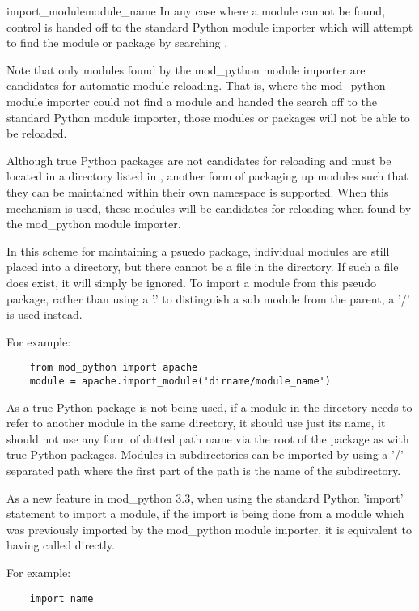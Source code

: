\begin{funcdesc}{import_module}{module_name}
  In any case where a module cannot be found, control is handed off to the
  standard Python module importer which will attempt to find the module or
  package by searching .

  Note that only modules found by the mod_python module importer are
  candidates for automatic module reloading. That is, where the mod_python
  module importer could not find a module and handed the search off to the
  standard Python module importer, those modules or packages will not be
  able to be reloaded.

  Although true Python packages are not candidates for reloading and must
  be located in a directory listed in , another form of
  packaging up modules such that they can be maintained within their own
  namespace is supported. When this mechanism is used, these modules will
  be candidates for reloading when found by the mod_python module importer.

  In this scheme for maintaining a psuedo package, individual modules are
  still placed into a directory, but there cannot be a 
  file in the directory. If such a file does exist, it will simply be
  ignored. To import a module from this pseudo package, rather than using
  a '.' to distinguish a sub module from the parent, a '/' is used instead.

  For example:

  \begin{verbatim}
    from mod_python import apache
    module = apache.import_module('dirname/module_name')
  \end{verbatim}

  As a true Python package is not being used, if a module in the directory
  needs to refer to another module in the same directory, it should use
  just its name, it should not use any form of dotted path name via the
  root of the package as with true Python packages. Modules in
  subdirectories can be imported by using a '/' separated path where the
  first part of the path is the name of the subdirectory.

  As a new feature in mod_python 3.3, when using the standard Python
  'import' statement to import a module, if the import is being done from a
  module which was previously imported by the mod_python module importer,
  it is equivalent to having called  directly.

  For example:

  \begin{verbatim}
    import name
  \end{verbatim}


\end{funcdesc}
